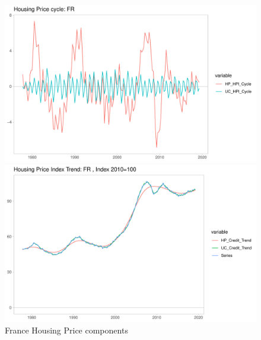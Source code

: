 \documentclass[fleqn]{article}
\begin{document}
\begin{outline}[enumerate]
\begin{figure}[h!]
	\caption{France Housing Price components}	
	\centerline{\includegraphics[scale=0.7]{../Output/Graphs/HP_cycle_FR.pdf}}
	\centerline{\includegraphics[scale=0.7]{../Output/Graphs/HP_trend_FR.pdf}}
\end{figure}



\end{outline}
\end{document}
